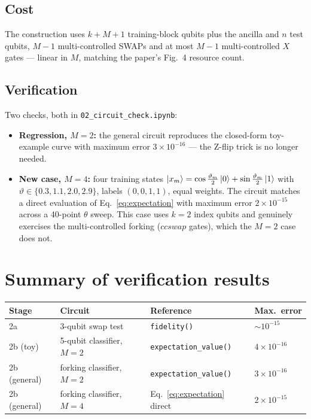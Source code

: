 \documentclass[11pt,a4paper]{article}
\begin{document}
\subsection{Cost}

The construction uses $k + M + 1$ training-block qubits plus the ancilla
and $n$ test qubits, $M - 1$ multi-controlled SWAPs and at most $M - 1$
multi-controlled $X$ gates --- linear in $M$, matching the paper's
Fig.~4 resource count.

\subsection{Verification}

Two checks, both in \texttt{02\_circuit\_check.ipynb}:
\begin{itemize}
  \item \textbf{Regression, $M = 2$:} the general circuit reproduces the
        closed-form toy-example curve with maximum error
        $3 \times 10^{-16}$ --- the Z-flip trick is no longer needed.
  \item \textbf{New case, $M = 4$:} four training states
        $\ket{x_m} = \cos\tfrac{\vartheta_m}{2}\ket{0} +
        \sin\tfrac{\vartheta_m}{2}\ket{1}$ with
        $\vartheta \in \{0.3, 1.1, 2.0, 2.9\}$, labels $(0,0,1,1)$, equal
        weights. The circuit matches a direct evaluation of
        Eq.~\eqref{eq:expectation} with maximum error
        $2 \times 10^{-15}$ across a 40-point $\theta$ sweep. This case
        uses $k = 2$ index qubits and genuinely exercises the
        multi-controlled forking ($ccswap$ gates), which the $M = 2$ case
        does not.
\end{itemize}

\section{Summary of verification results}

\begin{center}
\begin{tabular}{llll}
  \toprule
  Stage & Circuit & Reference & Max.\ error \\
  \midrule
  2a & 3-qubit swap test & \texttt{fidelity()} & $\sim 10^{-15}$ \\
  2b (toy) & 5-qubit classifier, $M=2$ & \texttt{expectation\_value()} & $4 \times 10^{-16}$ \\
  2b (general) & forking classifier, $M=2$ & \texttt{expectation\_value()} & $3 \times 10^{-16}$ \\
  2b (general) & forking classifier, $M=4$ & Eq.~\eqref{eq:expectation} direct & $2 \times 10^{-15}$ \\
  \bottomrule
\end{tabular}
\end{center}
\end{document}
